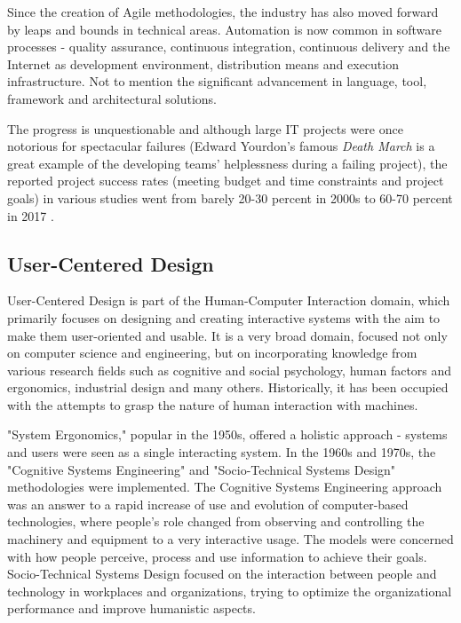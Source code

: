 \documentclass{article}
\begin{document}
Since the creation of Agile methodologies, the industry has also moved forward by leaps and bounds in technical areas. Automation is now common in software processes - quality assurance, continuous integration, continuous delivery and the Internet as development environment, distribution means and execution infrastructure. Not to mention the significant advancement in language, tool, framework and architectural solutions. \citep{fuggetta2014software}

The progress is unquestionable and although large IT projects were once notorious for spectacular failures (Edward Yourdon's famous \textit{Death March} \citep{yourdon1997death} is a great example of the developing teams' helplessness during a failing project), the reported project success rates (meeting budget and time constraints and project goals) in various studies went from barely 20-30 percent in 2000s \citep{kaur2013software} to 60-70 percent in 2017 \citep{pmi2017pulse}.

\subsection{User-Centered Design}
User-Centered Design is part of the Human-Computer Interaction domain, which primarily focuses on designing and creating interactive systems with the aim to make them user-oriented and usable. It is a very broad domain, focused not only on computer science and engineering, but on incorporating knowledge from various research fields such as cognitive and social psychology, human factors and ergonomics, industrial design and many others. Historically, it has been occupied with the attempts to grasp the nature of human interaction with machines. \citep{ritter2014user}

"System Ergonomics," popular in the 1950s, offered a holistic approach - systems and users were seen as a single interacting system. In the 1960s and 1970s, the "Cognitive Systems Engineering" and "Socio-Technical Systems Design" methodologies were implemented. The Cognitive Systems Engineering approach was an answer to a rapid increase of use and evolution of computer-based technologies, where people's role changed from observing and controlling the machinery and equipment to a very interactive usage. The models were concerned with how people perceive, process and use information to achieve their goals. Socio-Technical Systems Design focused on the interaction between people and technology in workplaces and organizations, trying to optimize the organizational performance and improve humanistic aspects.
\end{document}
